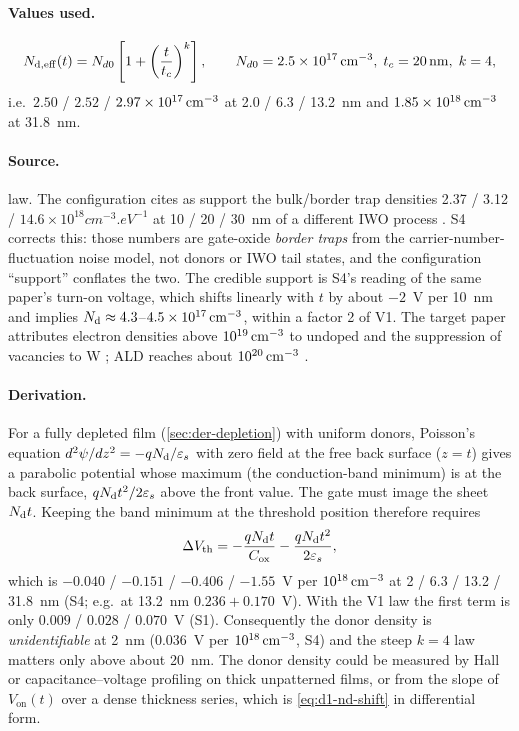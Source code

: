 \paragraph{Values used.}
\begin{equation}
  N_{\mathrm{d,eff}}(t) = N_{d0}\left[1+\left(\frac{t}{t_c}\right)^{k}\right],\qquad N_{d0} = 2.5\times10^{17}\,\mathrm{cm}^{-3},\;
  t_c = \SI{20}{nm},\; k = 4,
  \label{eq:d1-nd}
\end{equation}
i.e.\ $2.50$ / $2.52$ / $2.97\times10^{17}\,\mathrm{cm}^{-3}$ at 2.0 / 6.3 / 13.2~nm and $1.85\times10^{18}\,\mathrm{cm}^{-3}$ at 31.8~nm.

\paragraph{Source.}
 law. The configuration cites as support the bulk/border trap densities 2.37 / 3.12 /
$14.6\times10^{18}\si{cm^{-3}.eV^{-1}}$ at 10 / 20 / 30~nm of a different IWO process \citep[p.~173507-6]{Kim2024}. S4 corrects
this: those numbers are gate-oxide \emph{border traps} from the carrier-number-fluctuation noise model, not donors or
IWO tail states, and the configuration ``support'' conflates the two. The credible support is S4's reading of the
same paper's turn-on voltage, which shifts linearly with $t$ by about $-2$~V per 10~nm and implies
$N_{\mathrm{d}} \approx 4.3$--$4.5\times10^{17}\,\mathrm{cm}^{-3}$, within a factor 2 of V1. The target paper attributes electron densities
above $10^{19}\,\mathrm{cm}^{-3}$ to undoped \InO{} and the suppression of vacancies to W \citep[p.~2]{Januar2026}; ALD \InO{}
reaches about $10^{20}\,\mathrm{cm}^{-3}$ \citep[pp.~4--5]{Wang2022}.

\paragraph{Derivation.}
For a fully depleted film (\cref{sec:der-depletion}) with uniform donors, Poisson's equation
$d^2\psi/dz^2 = -qN_{\mathrm{d}}/\varepsilon_s$ with zero field at the free back surface ($z = t$) gives a parabolic potential
whose maximum (the conduction-band minimum) is at the back surface, $qN_{\mathrm{d}} t^2/2\varepsilon_s$ above the front value.
The gate must image the sheet $N_{\mathrm{d}} t$. Keeping the band minimum at the threshold position therefore requires
\begin{equation}
  \Delta V_{\mathrm{th}} = -\frac{qN_{\mathrm{d}} t}{C_{\mathrm{ox}}} - \frac{qN_{\mathrm{d}} t^{2}}{2\varepsilon_s},
  \label{eq:d1-nd-shift}
\end{equation}
which is $-0.040$ / $-0.151$ / $-0.406$ / $-1.55$~V per $10^{18}\,\mathrm{cm}^{-3}$ at 2 / 6.3 / 13.2 / 31.8~nm (S4; e.g.\ at 13.2~nm
$0.236 + 0.170$~V). With the V1 law the first term is only $0.009$ / $0.028$ / $0.070$~V (S1). Consequently the
donor density is \emph{unidentifiable} at 2~nm (0.036~V per $10^{18}\,\mathrm{cm}^{-3}$, S4) and the steep $k = 4$ law matters only
above about 20~nm. The donor density could be measured by Hall or capacitance--voltage profiling on thick unpatterned films,
or from the slope of $V_{\mathrm{on}}(t)$ over a dense thickness series, which is \cref{eq:d1-nd-shift} in differential form.

